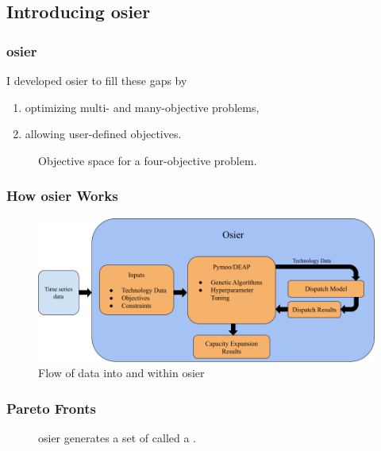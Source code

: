 \subsection{Introducing \gls{osier}}
\begin{frame}
    \frametitle{\gls{osier}}
    I developed \gls{osier} to fill these gaps by \cite{dotson_osier_2024}
    \begin{enumerate}
        \item optimizing multi- and many-objective problems,
        \item allowing user-defined objectives.
    \end{enumerate}
    
    \begin{figure}
        \centering
        \resizebox{0.95\columnwidth}{!}{}
        \caption{Objective space for a four-objective problem.}
        \label{fig:4-obj-space}
    \end{figure}
\end{frame}

\begin{frame}
    \frametitle{How \gls{osier} Works}

    \begin{figure}
        \centering
        \includegraphics[width=\columnwidth]{../docs/figures/03_osier_chapter/osier_flow.png}
        \caption{Flow of data into and within \gls{osier}}
        \label{fig:osier-flow}
    \end{figure}

\end{frame}

\begin{frame}
    \frametitle{Pareto Fronts}
    \begin{figure}
        \centering
        \resizebox{0.75\columnwidth}{!}{}
        \caption{\gls{osier} generates a set of  called a .}
    \end{figure}
\end{frame}

